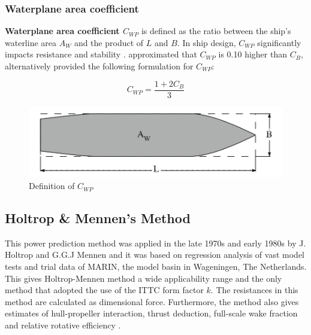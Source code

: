 \pagebreak

\subsubsection*{Waterplane area coefficient}

\textbf{Waterplane area coefficient $C_{WP}$} is defined as the ratio between the ship's waterline area $A_{W}$ and the product of $L$ and $B$. In ship design, $C_{WP}$ significantly impacts resistance and stability .  approximated that $C_{WP}$ is 0.10 higher than $C_B$, alternatively  provided the following formulation for $C_{WP}$:

\begin{equation}
    \label{eqn:cwp_Schneekluth}
    C_{WP} = \frac{1+2C_B}{3}
\end{equation}

\begin{figure}[ht]
    \centering
        \includegraphics[width=.5\textwidth]{02_figures/biran14_cwp.jpg}
        \caption{Definition of $C_{WP}$ }
        \label{fig:biran_cwp}
\end{figure}

\subsection{Holtrop \& Mennen's Method}\label{sec:holtrop_mennen_calc}

This power prediction method was applied in the late 1970s and early 1980s by J. Holtrop and G.G.J Mennen and it was based on regression analysis of vast model tests and trial data of MARIN, the model basin in Wageningen, The Netherlands. This gives Holtrop-Mennen method a wide applicability range and the only method that adopted the use of the ITTC form factor $k$. The resistances in this method are calculated as dimensional force. Furthermore, the method also gives estimates of hull-propeller interaction, thrust deduction, full-scale wake fraction and relative rotative efficiency . 


